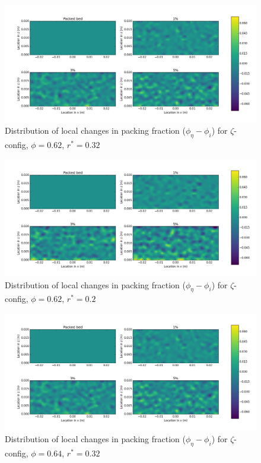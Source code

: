 \documentclass[11pt]{report} %
\begin{document}
\begin{figure}[!t]
    \centering
    \includegraphics[width = \textwidth]{images/z-62-r23-1-deltas.png}
    \caption{Distribution of local changes in packing fraction ($\phi_{\eta} - \phi_i$) for $\zeta$-config, $\phi = 0.62$, $r^* = 0.32$}\label{fig:z-62-r23-deltas}
\end{figure}

\begin{figure}[!t]
    \centering
    \includegraphics[width = \textwidth]{images/z-62-r125-1-deltas.png}
    \caption{Distribution of local changes in packing fraction ($\phi_{\eta} - \phi_i$) for $\zeta$-config, $\phi = 0.62$, $r^* = 0.2$}\label{fig:z-62-r125-deltas}
\end{figure}

\begin{figure}[!t]
    \centering
    \includegraphics[width = \textwidth]{images/z-62-r23-1-deltas.png}
    \caption{Distribution of local changes in packing fraction ($\phi_{\eta} - \phi_i$) for $\zeta$-config, $\phi = 0.64$, $r^* = 0.32$}\label{fig:z-624-r23-deltas}
\end{figure}
\end{document}
